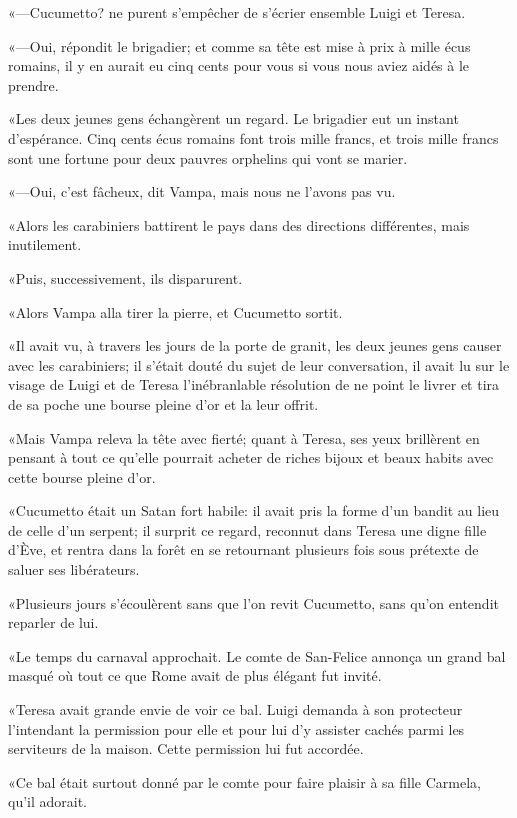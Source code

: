 «—Cucumetto? ne purent s'empêcher de s'écrier ensemble Luigi et Teresa. 

«—Oui, répondit le brigadier; et comme sa tête est mise à prix à mille écus romains, il y en aurait eu cinq cents pour vous si vous nous aviez aidés à le prendre. 

«Les deux jeunes gens échangèrent un regard. Le brigadier eut un instant d'espérance. Cinq cents écus romains font trois mille francs, et trois mille francs sont une fortune pour deux pauvres orphelins qui vont se marier. 

«—Oui, c'est fâcheux, dit Vampa, mais nous ne l'avons pas vu. 

«Alors les carabiniers battirent le pays dans des directions différentes, mais inutilement. 

«Puis, successivement, ils disparurent. 

«Alors Vampa alla tirer la pierre, et Cucumetto sortit. 

«Il avait vu, à travers les jours de la porte de granit, les deux jeunes gens causer avec les carabiniers; il s'était douté du sujet de leur conversation, il avait lu sur le visage de Luigi et de Teresa l'inébranlable résolution de ne point le livrer et tira de sa poche une bourse pleine d'or et la leur offrit. 

«Mais Vampa releva la tête avec fierté; quant à Teresa, ses yeux brillèrent en pensant à tout ce qu'elle pourrait acheter de riches bijoux et beaux habits avec cette bourse pleine d'or. 

«Cucumetto était un Satan fort habile: il avait pris la forme d'un bandit au lieu de celle d'un serpent; il surprit ce regard, reconnut dans Teresa une digne fille d'Ève, et rentra dans la forêt en se retournant plusieurs fois sous prétexte de saluer ses libérateurs. 

«Plusieurs jours s'écoulèrent sans que l'on revit Cucumetto, sans qu'on entendit reparler de lui. 

«Le temps du carnaval approchait. Le comte de San-Felice annonça un grand bal masqué où tout ce que Rome avait de plus élégant fut invité. 

«Teresa avait grande envie de voir ce bal. Luigi demanda à son protecteur l'intendant la permission pour elle et pour lui d'y assister cachés parmi les serviteurs de la maison. Cette permission lui fut accordée. 

«Ce bal était surtout donné par le comte pour faire plaisir à sa fille Carmela, qu'il adorait. 

